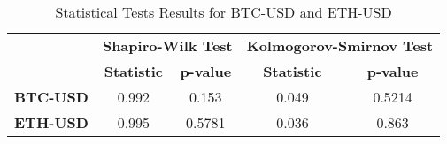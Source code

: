 \begin{table}[ht]
\centering
\begin{tabular}{|l|cc|cc|}
\hline
\textbf{} & \multicolumn{2}{c|}{\textbf{Shapiro-Wilk Test}} & \multicolumn{2}{c|}{\textbf{Kolmogorov-Smirnov Test}} \\
\textbf{} & \textbf{Statistic} & \textbf{p-value} & \textbf{Statistic} & \textbf{p-value} \\
\hline
\textbf{BTC-USD} & 0.992 & 0.153 & 0.049 & 0.5214 \\
\hline
\textbf{ETH-USD} & 0.995 & 0.5781 & 0.036 & 0.863 \\
\hline
\end{tabular}
\caption{Statistical Tests Results for BTC-USD and ETH-USD}
\label{tab:test_results}

\end{table}
